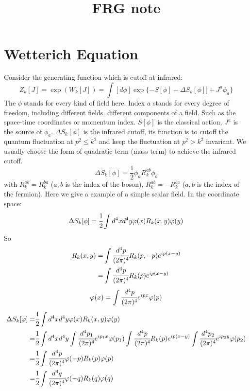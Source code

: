 \documentclass[UTF8]{article}
\begin{document}
\title{FRG note}
\maketitle
\newpage
\tableofcontents
\newpage
\section{Wetterich Equation}
Consider the generating function which is cutoff at infrared:
\begin{equation}\label{eq0001}
Z_k[J]=\exp(W_k[J])=\int [d\phi]\exp\{-S[\phi]-\Delta S_k[\phi]]+J^a\phi_a\}
\end{equation}
The $\phi$ stands for every kind of field here. Index $a$ stands for every degree of freedom, including different fields, different components of a field. Such as the space-time coordinates or momentum index.
$S[\phi]$ is the classical action, $J^a$ is the source of $\phi_a$. $\Delta S_k[\phi]$ is the infrared cutoff,
 its function is to cutoff the quantum fluctuation at $p^2\leq k^2$ and keep the fluctuation at $p^2>k^2$ invariant.
  We usually choose the form of quadratic term (mass term) to achieve the infrared cutoff. 
\begin{equation}\label{eq0002}
\Delta S_k[\phi]=\frac{1}{2}\phi_aR_{k}^{ab}\phi_b
\end{equation}
with $R_{k}^{ab}=R_{k}^{ba}$ ($a,b$ is the index of the boson), $R_{k}^{ab}=-R_{k}^{ba}$ ($a,b$ is the index of the fermion). Here we give a example of a simple scalar field. In the coordinate space:
\begin{equation}
\Delta S_k[\phi]=
\cfrac{1}{2}\int d^4xd^4y\varphi(x)R_k(x,y)\varphi(y)
\end{equation}
So 
\begin{equation}
\begin{split}
R_k(x,y)= & \int\cfrac{d^4p}{(2\pi)^4}R_k(p,-p)e^{ip(x-y)}\\
= & \int\cfrac{d^4p}{(2\pi)^4} R_k(p)e^{ip(x-y)}
\end{split}
\end{equation}
\begin{equation}
\varphi(x)=\int\cfrac{d^4p}{(2\pi)^4}e^{ipx}\varphi(p)
\end{equation}
\begin{equation}
\begin{split}
\Delta S_k[\varphi]=&\cfrac{1}{2}\int d^4xd^4y\varphi(x)R_k(x,y)\varphi(y)\\
=&\cfrac{1}{2}\int d^4xd^4y
\int\cfrac{d^4p_1}{(2\pi)^4}e^{ip_1x}\varphi(p_1)
\int\cfrac{d^4p}{(2\pi)^4}R_k(p)e^{ip(x-y)}
\int\cfrac{d^4p_2}{(2\pi)^4}e^{ip_2y}\varphi(p_2)\\
=&\cfrac{1}{2}\int\cfrac{d^4p}{(2\pi)^4}\varphi(-p)R_k(p)\varphi(p)\\
=&\cfrac{1}{2}\int\cfrac{d^4q}{(2\pi)^4}\varphi(-q)R_k(q)\varphi(q)
\end{split}
\end{equation}
\end{document}

